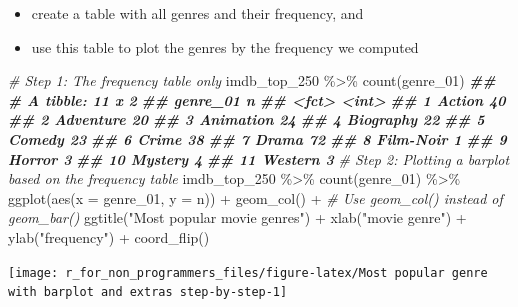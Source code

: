 \documentclass[
]{book}
\newenvironment{Shaded}{\begin{snugshade}}{\end{snugshade}}
\newcommand{\AttributeTok}[1]{\textcolor[rgb]{0.77,0.63,0.00}{#1}}
\newcommand{\CommentTok}[1]{\textcolor[rgb]{0.56,0.35,0.01}{\textit{#1}}}
\newcommand{\DocumentationTok}[1]{\textcolor[rgb]{0.56,0.35,0.01}{\textbf{\textit{#1}}}}
\newcommand{\FunctionTok}[1]{\textcolor[rgb]{0.00,0.00,0.00}{#1}}
\newcommand{\NormalTok}[1]{#1}
\newcommand{\SpecialCharTok}[1]{\textcolor[rgb]{0.00,0.00,0.00}{#1}}
\newcommand{\StringTok}[1]{\textcolor[rgb]{0.31,0.60,0.02}{#1}}
\begin{document}
\begin{itemize}
\item
  create a table with all genres and their frequency, and
\item
  use this table to plot the genres by the frequency we computed
\end{itemize}

\begin{Shaded}
\begin{Highlighting}[]
\CommentTok{\# Step 1: The frequency table only}
\NormalTok{imdb\_top\_250 }\SpecialCharTok{\%\textgreater{}\%} 
  \FunctionTok{count}\NormalTok{(genre\_01)}
\DocumentationTok{\#\# \# A tibble: 11 x 2}
\DocumentationTok{\#\#    genre\_01      n}
\DocumentationTok{\#\#    \textless{}fct\textgreater{}     \textless{}int\textgreater{}}
\DocumentationTok{\#\#  1 Action       40}
\DocumentationTok{\#\#  2 Adventure    20}
\DocumentationTok{\#\#  3 Animation    24}
\DocumentationTok{\#\#  4 Biography    22}
\DocumentationTok{\#\#  5 Comedy       23}
\DocumentationTok{\#\#  6 Crime        38}
\DocumentationTok{\#\#  7 Drama        72}
\DocumentationTok{\#\#  8 Film{-}Noir     1}
\DocumentationTok{\#\#  9 Horror        3}
\DocumentationTok{\#\# 10 Mystery       4}
\DocumentationTok{\#\# 11 Western       3}
\CommentTok{\# Step 2: Plotting a barplot based on the frequency table}
\NormalTok{imdb\_top\_250 }\SpecialCharTok{\%\textgreater{}\%} 
  \FunctionTok{count}\NormalTok{(genre\_01) }\SpecialCharTok{\%\textgreater{}\%} 
  \FunctionTok{ggplot}\NormalTok{(}\FunctionTok{aes}\NormalTok{(}\AttributeTok{x =}\NormalTok{ genre\_01, }\AttributeTok{y =}\NormalTok{ n)) }\SpecialCharTok{+}
  \FunctionTok{geom\_col}\NormalTok{() }\SpecialCharTok{+}                             \CommentTok{\# Use geom\_col() instead of geom\_bar()}
  \FunctionTok{ggtitle}\NormalTok{(}\StringTok{"Most popular movie genres"}\NormalTok{) }\SpecialCharTok{+}
  \FunctionTok{xlab}\NormalTok{(}\StringTok{"movie genre"}\NormalTok{) }\SpecialCharTok{+}
  \FunctionTok{ylab}\NormalTok{(}\StringTok{"frequency"}\NormalTok{) }\SpecialCharTok{+}
  \FunctionTok{coord\_flip}\NormalTok{()}
\end{Highlighting}
\end{Shaded}

\begin{center}\texttt{[image: r\_for\_non\_programmers\_files/figure-latex/Most popular genre with barplot and extras step-by-step-1]} \end{center}
\end{document}
